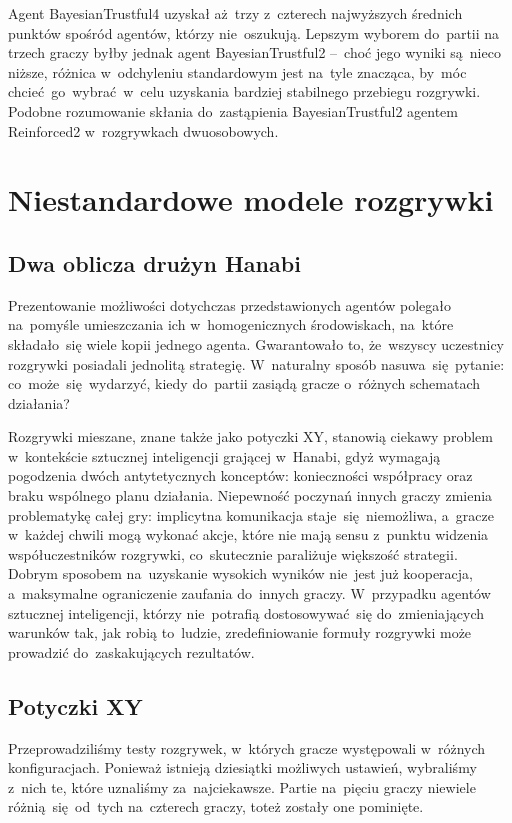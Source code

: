 \documentclass[declaration,shortabstract,inz]{iithesis}
\begin{document}
 Agent BayesianTrustful4 uzyskał aż~trzy z~czterech najwyższych średnich punktów spośród agentów, którzy nie~oszukują. Lepszym wyborem do~partii na trzech graczy byłby jednak agent BayesianTrustful2 --~choć jego wyniki są~nieco niższe, różnica w~odchyleniu standardowym jest na~tyle znacząca, by~móc chcieć go~wybrać w~celu uzyskania bardziej stabilnego przebiegu rozgrywki. Podobne rozumowanie skłania do~zastąpienia BayesianTrustful2 agentem Reinforced2 w~rozgrywkach dwuosobowych.

\chapter{Niestandardowe modele rozgrywki}
\label{sec:xy}

\section{Dwa oblicza drużyn Hanabi}

Prezentowanie możliwości dotychczas przedstawionych agentów polegało na~pomyśle umieszczania ich w~homogenicznych środowiskach, na~które składało~się wiele kopii jednego agenta. Gwarantowało to, że~wszyscy uczestnicy rozgrywki posiadali jednolitą strategię. W~naturalny sposób nasuwa~się pytanie: co~może~się wydarzyć, kiedy do~partii zasiądą gracze o~różnych schematach działania?

Rozgrywki mieszane, znane także jako potyczki XY, stanowią ciekawy problem w~kontekście sztucznej inteligencji grającej w~Hanabi, gdyż wymagają pogodzenia dwóch antytetycznych konceptów: konieczności współpracy oraz braku wspólnego planu działania. Niepewność poczynań innych graczy zmienia problematykę całej gry: implicytna komunikacja staje~się niemożliwa, a~gracze w~każdej chwili mogą wykonać akcje, które nie mają sensu z~punktu widzenia współuczestników rozgrywki, co~skutecznie paraliżuje większość strategii. Dobrym sposobem na~uzyskanie wysokich wyników nie~jest już kooperacja, a~maksymalne ograniczenie zaufania do~innych graczy. W~przypadku agentów sztucznej inteligencji, którzy nie~potrafią dostosowywać~się do~zmieniających warunków tak, jak robią to~ludzie, zredefiniowanie formuły rozgrywki może prowadzić do~zaskakujących rezultatów.

\section{Potyczki XY}

Przeprowadziliśmy testy rozgrywek, w~których gracze występowali w~różnych konfiguracjach. Ponieważ istnieją dziesiątki możliwych ustawień, wybraliśmy z~nich te, które uznaliśmy za~najciekawsze. Partie na~pięciu graczy niewiele różnią~się od~tych na~czterech graczy, toteż zostały one pominięte.
\end{document}
